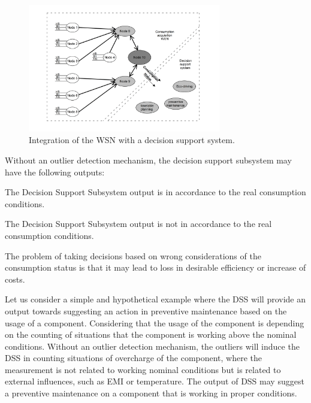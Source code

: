 \begin{figure}[h!]
	\centering
	\includegraphics[width=0.75\textwidth,keepaspectratio]{figures/general}
	\caption{Integration of the WSN with a decision support system. }
	\label{fig:general}
\end{figure}

\newpage
Without an outlier detection mechanism, the decision support subsystem may have the following outputs:


\begin{description}
	\setlength\itemsep{-0.5em}
	\item[Input deviation from real value lower than a threshold]
	The Decision Support Subsystem output is in accordance to the real consumption conditions.
	\item[Input deviation from real value greater than a threshold]
	The Decision Support Subsystem output is not in accordance to the real consumption conditions.	
\end{description}

The problem of taking decisions based on wrong considerations of the consumption status is that it may lead to loss in desirable efficiency or increase of costs.

Let us consider a simple and hypothetical example where the DSS will provide an output towards suggesting an action in preventive maintenance based on the usage of a component. Considering that the usage of the component is depending on the counting of situations that the component is working above the nominal conditions. Without an outlier detection mechanism, the outliers will induce the DSS in counting situations of overcharge of the component, where the measurement is not related to working nominal conditions but is related to external influences, such as EMI or temperature. The output of DSS may suggest a preventive maintenance on a component that is working in proper conditions.

